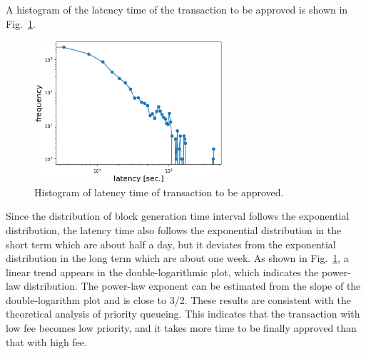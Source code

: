 \documentclass[graybox]{svmult}
\begin{document}
A histogram of the latency time of the transaction to be approved is shown in Fig.~\ref{fig:exp3-2}.
%
\begin{figure}[t]
  \begin{center}
    \includegraphics[width=70mm]{exp3-2.eps}
  \end{center}
  \caption{Histogram of latency time of transaction to be approved.}
  \label{fig:exp3-2}
\end{figure}
%
Since the distribution of block generation time interval follows the exponential distribution, the latency time also follows the exponential distribution in the short term which are about half a day, but it deviates from the exponential distribution in the long term which are about one week.
As shown in Fig.~\ref{fig:exp3-2}, a linear trend appears in the double-logarithmic plot, which indicates the power-law distribution.
The power-law exponent can be estimated from the slope of the double-logarithm plot and is close to 3/2.
These results are consistent with the theoretical analysis of priority queueing.
This indicates that the transaction with low fee becomes low priority, and it takes more time to be finally approved than that with high fee. 
\end{document}
